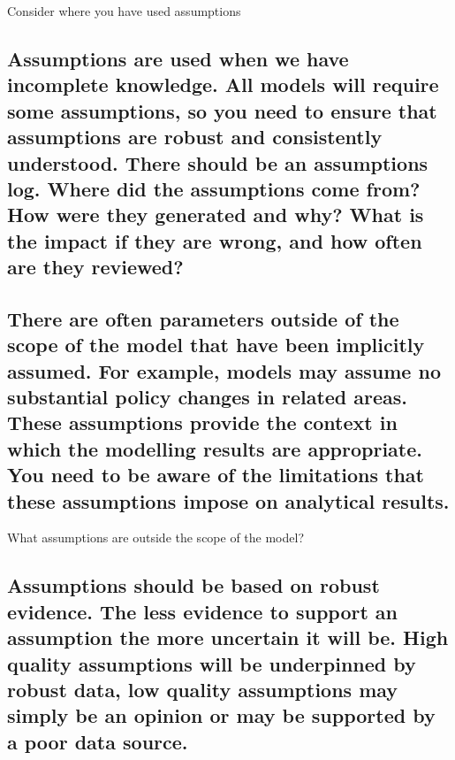 \documentclass[]{book}
\begin{document}
 Consider where you have used assumptions

\subsection{Assumptions are used when we have incomplete knowledge. All
models will require some assumptions, so you need to ensure that
assumptions are robust and consistently understood. There should be an
assumptions log. Where did the assumptions come from? How were they
generated and why? What is the impact if they are wrong, and how often
are they
reviewed?}\label{assumptions-are-used-when-we-have-incomplete-knowledge.-all-models-will-require-some-assumptions-so-you-need-to-ensure-that-assumptions-are-robust-and-consistently-understood.-there-should-be-an-assumptions-log.-where-did-the-assumptions-come-from-how-were-they-generated-and-why-what-is-the-impact-if-they-are-wrong-and-how-often-are-they-reviewed}

\subsection{There are often parameters outside of the scope of the model
that have been implicitly assumed. For example, models may assume no
substantial policy changes in related areas. These assumptions provide
the context in which the modelling results are appropriate. You need to
be aware of the limitations that these assumptions impose on analytical
results.}\label{there-are-often-parameters-outside-of-the-scope-of-the-model-that-have-been-implicitly-assumed.-for-example-models-may-assume-no-substantial-policy-changes-in-related-areas.-these-assumptions-provide-the-context-in-which-the-modelling-results-are-appropriate.-you-need-to-be-aware-of-the-limitations-that-these-assumptions-impose-on-analytical-results.}

 What assumptions are outside the scope of the model?

\subsection{Assumptions should be based on robust evidence. The less
evidence to support an assumption the more uncertain it will be. High
quality assumptions will be underpinned by robust data, low quality
assumptions may simply be an opinion or may be supported by a poor data
source.}\label{assumptions-should-be-based-on-robust-evidence.-the-less-evidence-to-support-an-assumption-the-more-uncertain-it-will-be.-high-quality-assumptions-will-be-underpinned-by-robust-data-low-quality-assumptions-may-simply-be-an-opinion-or-may-be-supported-by-a-poor-data-source.}
\end{document}
